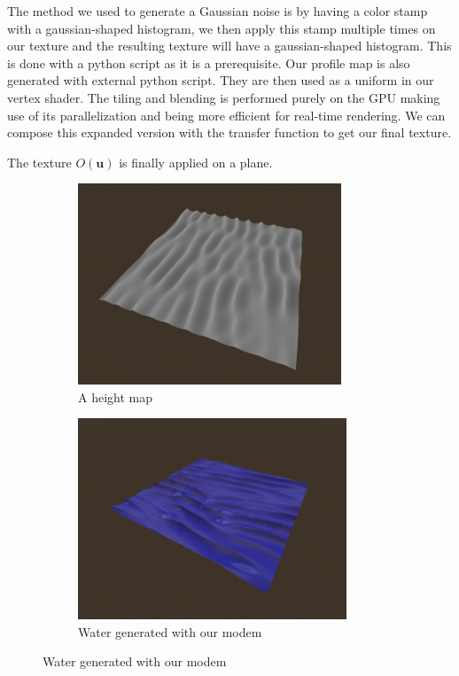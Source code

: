\documentclass{article}
\begin{document}
The method we used to generate a Gaussian noise is by having a color stamp with a gaussian-shaped histogram, we then apply this stamp multiple times on our texture and the resulting texture will have a gaussian-shaped histogram. This is done with a python script as it is a prerequisite.
Our profile map is also generated with external python script. They are then used as a uniform in our vertex shader.
The tiling and blending is performed purely on the GPU making use of its parallelization and being more efficient for real-time rendering.
We can compose this expanded version with the transfer function to get our final texture.


The texture $O(\textbf{u})$ is finally applied on a plane.
\begin{figure}[H]
    \centering
    \begin{subfigure}[b]{0.48\linewidth}
        \centering
        \includegraphics[height=6cm, keepaspectratio]{images/map.png}
        \caption{A height map}
    \end{subfigure}
    \hfill
    \begin{subfigure}[b]{0.48\linewidth}
        \centering
        \includegraphics[height=6cm, keepaspectratio]{images/eau.png}
        \caption{Water generated with our modem}
    \end{subfigure}
\end{figure}
\end{document}
